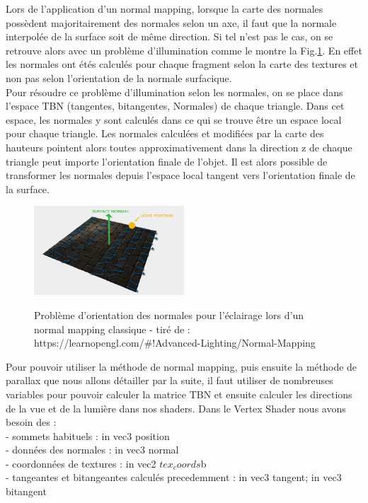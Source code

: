 \documentclass[a4paper]{article}
\begin{document}
Lors de l'application d'un normal mapping, lorsque la carte des normales possèdent majoritairement des normales selon un axe, il faut que la normale interpolée de la surface soit de même direction. Si tel n'est pas le cas, on se retrouve alors avec un problème d'illumination  comme le montre la Fig.\ref{lighting_problem}. En effet les normales ont étés calculés pour chaque fragment selon la carte des textures et non pas selon l'orientation de la normale surfacique. \\

Pour résoudre ce problème d'illumination selon les normales, on se place dans l'espace TBN (tangentes, bitangentes, Normales) de chaque triangle. Dans cet espace, les normales y sont calculés dans ce qui se trouve être un espace local pour chaque triangle. Les normales calculées et modifiées par la carte des hauteurs pointent alors toutes approximativement dans la direction z de chaque triangle peut importe l'orientation finale de l'objet. Il est alors possible de transformer les normales depuis l'espace local tangent vers l'orientation finale de la surface. 


\begin{figure}[H]
\centering
\includegraphics[width=0.5\textwidth]{figures/lighting_problem.png}\label{lighting_problem}
\caption{Problème d'orientation des normales pour l'éclairage lors d'un normal mapping classique - tiré de :  https://learnopengl.com/\#!Advanced-Lighting/Normal-Mapping}
\end{figure}


Pour pouvoir utiliser la méthode de normal mapping, puis ensuite la méthode de parallax que nous allons détailler par la suite, il faut utiliser de nombreuses variables  pour pouvoir calculer la matrice TBN et ensuite calculer les directions de la vue et de la lumière dans nos shaders.
Dans le Vertex Shader nous avons besoin des : \\
- sommets habituels : in vec3 position \\
- données des normales : in vec3 normal \\
- coordonnées de textures : in vec2 $tex_coords$b\\
- tangeantes et bitangeantes calculés precedemment : in vec3 tangent; in vec3 bitangent
 \\
\end{document}
